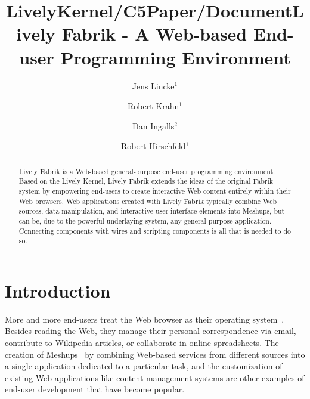 \documentclass[pdftex, times, 10pt, twocolumn]{article}
\title{LivelyKernel/C5Paper/Document}
\author{ }
\date{ }
\begin{document}
\title{Lively Fabrik - A Web-based End-user Programming Environment}

\author{%
Jens Lincke$^1$  \\
\and
Robert Krahn$^1$\\
\and
Dan Ingalls$^2$\\
\and
Robert Hirschfeld$^1$\\
}


\maketitle
\thispagestyle{empty}


 

\begin{abstract} 

Lively Fabrik is a Web-based general-purpose end-user programming environment. Based on the Lively Kernel, Lively Fabrik extends the ideas of the original Fabrik system by empowering end-users to create interactive Web content entirely within their Web browsers. Web applications created with Lively Fabrik typically combine Web sources, data manipulation, and interactive user interface elements into Meshups, but can be, due to the powerful underlaying system, any general-purpose application. Connecting components with wires and scripting components is all that is needed to do so.  

\end{abstract} 



\section{Introduction}
More and more end-users treat the Web browser as their operating system~\cite{Taivalsaari2008TLKE}. Besides reading the Web, they manage their personal correspondence via email, contribute to Wikipedia articles, or collaborate in online spreadsheets. The creation of Meshups~\cite{Merrill2006MNB} by combining Web-based services from different sources into a single application dedicated to a particular task, and the customization of existing Web applications like content management systems are other examples of end-user development that have become popular.  
\end{document}

